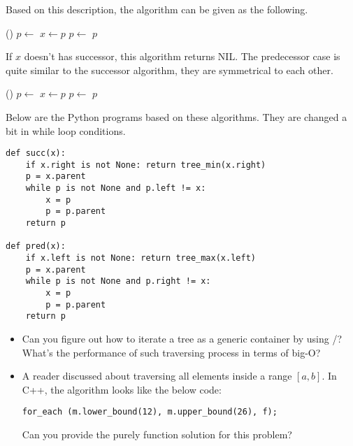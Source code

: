 \documentclass[b5paper]{article}
\begin{document}
Based on this description, the algorithm can be given as the following.

\begin{algorithmic}[1]
    \State \Return {}()
  \Else
    \State $p \gets $ 
      \State $x \gets p$
      \State $p \gets $ 
    \EndWhile
    \State \Return $p$
  \EndIf
\EndFunction
\end{algorithmic}

If $x$ doesn't has successor, this algorithm returns NIL.
The predecessor case is quite similar to the successor algorithm, they
are symmetrical to each other.

\begin{algorithmic}[1]
    \State \Return {}()
  \Else
    \State $p \gets $ 
      \State $x \gets p$
      \State $p \gets $ 
    \EndWhile
    \State \Return $p$
  \EndIf
\EndFunction
\end{algorithmic}

Below are the Python programs based on these algorithms. They are changed
a bit in while loop conditions.

\lstset{language=Python}
\begin{lstlisting}
def succ(x):
    if x.right is not None: return tree_min(x.right)
    p = x.parent
    while p is not None and p.left != x:
        x = p
        p = p.parent
    return p

def pred(x):
    if x.left is not None: return tree_max(x.left)
    p = x.parent
    while p is not None and p.right != x:
        x = p
        p = p.parent
    return p
\end{lstlisting}

\begin{Exercise}

\begin{itemize}
\item Can you figure out how to iterate a tree as a generic container
by using /? What's the performance of such traversing
process in terms of big-O?

\item A reader discussed about traversing all elements inside a
range $[a, b]$. In C++, the algorithm looks like the below code:

\texttt{for\_each (m.lower\_bound(12), m.upper\_bound(26), f);}

Can you provide the purely function solution for this problem?
\end{itemize}

\end{Exercise}
\end{document}
